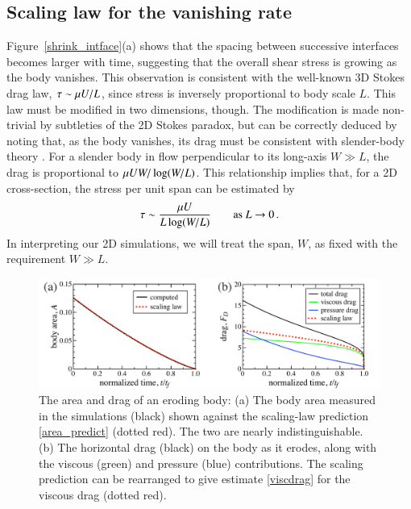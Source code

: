 \documentclass[preprint, 10pt]{elsarticle}
\begin{document}
\subsection{Scaling law for the vanishing rate}
\label{sec:scaling}

Figure~\ref{shrink_intface}(a) shows that the spacing between successive interfaces becomes larger with time, suggesting that the overall shear stress is growing as the body vanishes. This observation is consistent with the well-known 3D Stokes drag law, $\tau \sim \mu U / L$, since stress is inversely proportional to body scale $L$. This law must be modified in two dimensions, though.
The modification is made non-trivial by subtleties of the 2D Stokes paradox, but can be correctly deduced by noting that, as the body vanishes, its drag must be consistent with slender-body theory \cite{poz1997, bouzarth2007epicyclic, camassa2008trajectory, MooreJFM2012, zhao2015transportation}. 
For a slender body in flow perpendicular to its long-axis $W \gg L$, the drag is proportional to
$\mu U W/ \log(W/L)$. This relationship implies that, for a 2D
cross-section, the stress per unit span can be estimated by
\begin{align}
  \label{eqn:stresslaw}
  \tau \sim \frac{\mu U}{L \log(W/L)} \qquad \text{as } L \to 0 \, .
\end{align}
In interpreting our 2D simulations, we will treat the span, $W$, as fixed with the
requirement $W \gg L$.

\begin{figure}%
\begin{center}
\includegraphics[width = 0.85 \textwidth]{./figs/area_drag.pdf}
\caption{The area and drag of an eroding body: (a) The body area measured in the simulations (black) shown against the scaling-law prediction \eqref{area_predict} (dotted red). The two are nearly indistinguishable. (b) The horizontal drag (black) on the body as it erodes, along with the viscous (green) and pressure (blue) contributions. The scaling prediction can be rearranged to give estimate \eqref{viscdrag} for the viscous drag (dotted red).}
\label{area_drag}
\end{center}
\end{figure}
\end{document}
